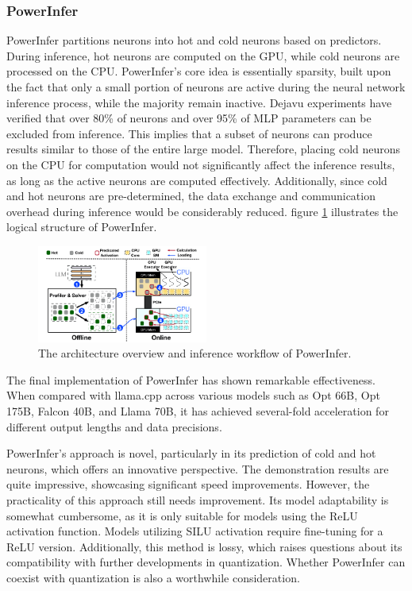\documentclass[conference]{IEEEtran}
\begin{document}
\subsubsection{PowerInfer}
PowerInfer\cite{b21} partitions neurons into hot and cold neurons based on predictors. During inference, hot neurons are computed on the GPU, while cold neurons are processed on the CPU.
PowerInfer's core idea is essentially sparsity, built upon the fact that only a small portion of neurons are active during the neural network inference process, while the majority remain inactive. Dejavu experiments have verified that over 80\% of neurons and over 95\% of MLP parameters can be excluded from inference\cite{b23}. This implies that a subset of neurons can produce results similar to those of the entire large model. Therefore, placing cold neurons on the CPU for computation would not significantly affect the inference results, as long as the active neurons are computed effectively. Additionally, since cold and hot neurons are pre-determined, the data exchange and communication overhead during inference would be considerably reduced.
figure \ref{device fig2} illustrates the logical structure of PowerInfer.
\begin{figure}[htbp]
    \centerline{\includegraphics[width=0.5\textwidth]{device fig1.png}}
    \caption{The architecture overview and inference workflow of PowerInfer.}
    \label{device fig2}
\end{figure}
The final implementation of PowerInfer has shown remarkable effectiveness. When compared with llama.cpp across various models such as Opt 66B, Opt 175B, Falcon 40B, and Llama 70B, it has achieved several-fold acceleration for different output lengths and data precisions.

PowerInfer's approach is novel, particularly in its prediction of cold and hot neurons, which offers an innovative perspective. The demonstration results are quite impressive, showcasing significant speed improvements. However, the practicality of this approach still needs improvement. Its model adaptability is somewhat cumbersome, as it is only suitable for models using the ReLU activation function. Models utilizing SILU activation require fine-tuning for a ReLU version. Additionally, this method is lossy, which raises questions about its compatibility with further developments in quantization. Whether PowerInfer can coexist with quantization is also a worthwhile consideration.
\end{document}
